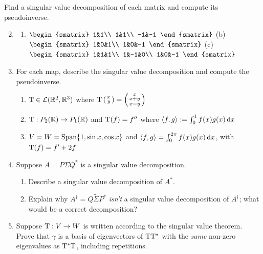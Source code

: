 \begin{exercises}
	\exstart Find a singular value decomposition of each matrix and compute its pseudoinverse.
	\begin{enumerate}\setcounter{enumi}{1}
  	\item[]\begin{enumerate}
    	\item $\begin{smatrix}
    		1&1\\
    		1&1\\
    		-1&-1
    	\end{smatrix}$\qquad
    	(b)\ \ 
    	$\begin{smatrix}
    		1&0&1\\
    		1&0&-1
    	\end{smatrix}$\qquad
    	(c)\ \ 
    	$\begin{smatrix}
    		1&1&1\\
    		1&-1&0\\
    		1&0&-1
    	\end{smatrix}$
  	\end{enumerate}
  
  
  	\pagebreak[3]
  
  
	  \item For each map, describe the singular value decomposition and compute the pseudoinverse.
	  \begin{enumerate}
	    \item $\mathrm{T}\in\mathcal{L}(\mathbb{R}^2,\mathbb{R}^3)$ where $\mathrm{T}\left(\begin{smallmatrix}x\\y\end{smallmatrix}\right)=\left(\begin{smallmatrix}x\\x+y\\x-y\end{smallmatrix}\right)$
	    \item $\mathrm{T}:P_2(\mathbb{R})\to P_1(\mathbb{R})$ and $\mathrm{T}(f)=f''$ where $\left\langle f,g\right\rangle:=\int_0^1f(x)g(x)\,{\mathrm{d} x}$
	    \item $V=W=\operatorname{Span}\{1,\sin x,\cos x\}$ and $\left\langle f,g\right\rangle=\int_0^{2\pi}f(x)g(x)\,{\mathrm{d} x}$, with $\mathrm{T}(f)=f'+2f$
	  \end{enumerate}
  
  
   
  \item Suppose $A=P\Sigma Q^*$ is a singular value decomposition.
  \begin{enumerate}
    \item Describe a singular value decomposition of $A^*$.
    \item Explain why $A^\dag=Q\widetilde\Sigma P^*$ \emph{isn't} a singular value decomposition of $A^\dag$; what would be a correct decomposition?
  \end{enumerate}
  
  
  \item Suppose $\mathrm{T}:V\to W$ is written according to the singular value theorem. Prove that $\gamma$ is a basis of eigenvectors of $\mathrm{T}\mathrm{T}^*$ with the \emph{same} non-zero eigenvalues as $\mathrm{T}^*\mathrm{T}$, including repetitions.
  

\end{enumerate}
\end{exercises}
